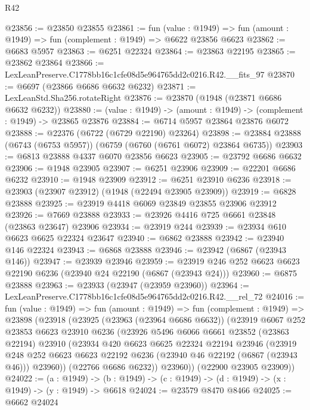 \begin{lexlean}{R42}
\begin{coremodule}
{@23856 := @23850 @23855
@23861 := fun (value : @1949) =>
  fun (amount : @1949) => fun (complement : @1949) => @6622 @23856 @6623
@23862 := @6683 @5957
@23863 := @6251 @22324
@23864 := @23863 @22195
@23865 := @23862 @23864
@23866 := LexLeanPreserve.C1778bb16c1cfe08d5e964765dd2c0216.R42.__fits_97
@23870 := @6697 (@23866 @6686 @6632 @6232)
@23871 := LexLeanStd.Sha256.rotateRight
@23876 := @23870 (@1948 (@23871 @6686 @6632 @6232))
@23880 := (value : @1949) -> (amount : @1949) -> (complement : @1949) -> @23865 @23876
@23884 := @6714 @5957 @23864 @23876 @6072
@23888 := @22376 (@6722 (@6729 @22190) @23264)
@23898 := @23884 @23888 (@6743 (@6753 @5957)) (@6759 (@6760 (@6761 @6072) @23864 @6735))
@23903 := @6813 @23888 @4337 @6070 @23856 @6623
@23905 := @23792 @6686 @6632
@23906 := @1948 @23905
@23907 := @6251 @23906
@23909 := @22201 @6686 @6232
@23910 := @1948 @23909
@23912 := @6251 @23910 @6236
@23918 := @23903 (@23907 @23912) (@1948 (@22494 @23905 @23909))
@23919 := @6828 @23888
@23925 := @23919 @4418 @6069 @23849 @23855 @23906 @23912
@23926 := @7669 @23888
@23933 := @23926 @4416 @725 @6661 @23848 (@23863 @23647) @23906
@23934 := @23919 @244
@23939 := @23934 @610 @6623 @6625 @22324 @23647
@23940 := @6862 @23888
@23942 := @23940 @146 @22324
@23943 := @6868 @23888
@23946 := @23942 (@6867 (@23943 @146))
@23947 := @23939 @23946
@23959 := @23919 @246 @252 @6623 @6623 @22190 @6236 (@23940 @24 @22190 (@6867 (@23943 @24)))
@23960 := @6875 @23888
@23963 := @23933 (@23947 (@23959 @23960))
@23964 := LexLeanPreserve.C1778bb16c1cfe08d5e964765dd2c0216.R42.__rel_72
@24016 := fun (value : @1949) =>
  fun (amount : @1949) =>
  fun (complement : @1949) =>
  @23898
    (@23918
      (@23925
        (@23963 (@23964 @6686 @6632))
        (@23919
          @6067
          @252
          @23853
          @6623
          @23910
          @6236
          (@23926
            @5496
            @6066
            @6661
            @23852
            (@23863 @22194)
            @23910
            (@23934
              @420
              @6623
              @6625
              @22324
              @22194
              @23946
              (@23919
                @248
                @252
                @6623
                @6623
                @22192
                @6236
                (@23940 @46 @22192 (@6867 (@23943 @46)))
                @23960))
            (@22766 @6686 @6232))
          @23960))
      (@22900 @23905 @23909))
@24022 := (a : @1949) ->
  (b : @1949) -> (c : @1949) -> (d : @1949) -> (x : @1949) -> (y : @1949) -> @6618
@24024 := @23579 @8470 @8466
@24025 := @6662 @24024
}
\end{coremodule}
\end{lexlean}
